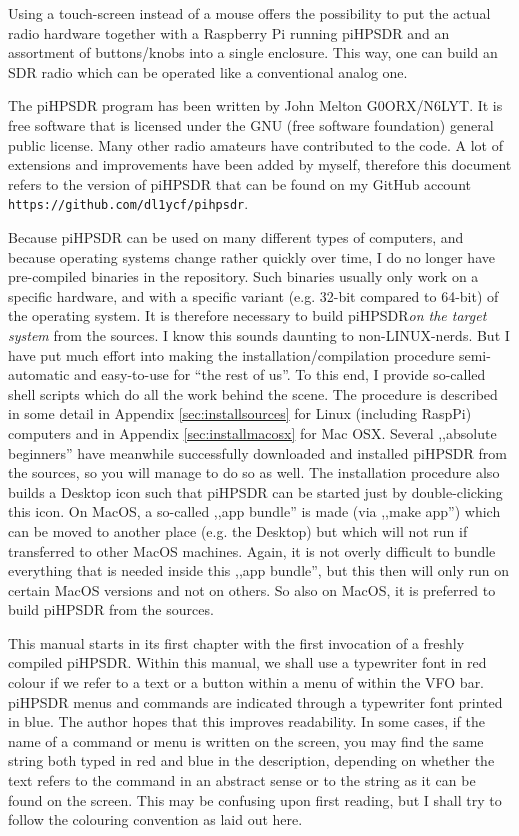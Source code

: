 \documentclass[12pt]{book}
\def\pH{pi\-HPSDR\xspace}
\begin{document}
Using a touch-screen instead of a mouse offers the possibility to put the actual radio hardware together
with a Raspberry Pi running \pH and an assortment of buttons/knobs into a single enclosure. This way,
one can build an SDR radio which can be operated like a conventional analog one.

The \pH program has been written by John Melton G0ORX/N6LYT. It is free software that is licensed under
the GNU (free software foundation) general public license. Many other radio amateurs have contributed to
the code. A lot of extensions and improvements have been added by myself, therefore this document refers
to the version of \pH that can be found on my GitHub account \texttt{https://github.com/dl1ycf/pihpsdr}.

Because \pH can be used on many different types of computers, and because operating systems change
rather quickly over time, I do no longer have pre-compiled binaries in the repository. Such binaries
usually only work on a specific hardware, and with a specific variant (e.g. 32-bit compared to 64-bit) of
the operating system. It is therefore necessary to build \pH \textit{on the target system}
from the sources. I know this sounds daunting to non-LINUX-nerds. But I have put much effort into making
the installation/compilation procedure semi-automatic and easy-to-use for ``the rest of us''.
To this end, I provide so-called shell scripts which do all the work behind the scene.
The procedure is described in some detail in Appendix \ref{sec:installsources} for Linux (including RaspPi)
computers and in Appendix \ref{sec:installmacosx} for Mac OSX. Several ,,absolute beginners'' have meanwhile
successfully downloaded and installed \pH from the sources, so you will manage to do so as well.
The installation procedure also builds a Desktop icon such that \pH can be started just by double-clicking
this icon.
On MacOS,
a so-called ,,app bundle'' is made (via ,,make app'') which can be moved to another place (e.g. the Desktop)
but which will not run if transferred to other MacOS machines. Again, it is not overly difficult
to bundle everything that is needed inside this ,,app bundle'', but this then will only run on certain
MacOS versions and not on others. So also on MacOS, it is preferred to build \pH from the sources.

This manual starts in its first chapter with the first invocation of a freshly compiled \pH.
Within this manual, we shall use a typewriter font in red colour if we refer to a text or a button within
a menu of within the VFO bar. \pH menus and commands are indicated through a typewriter font
printed in blue. The author hopes that this improves readability. In some cases, if the name of a command
or  menu is written on the screen, you may find the same string both typed in red and blue in the
description, depending on whether the text refers to the command in an abstract sense or to the string as it
can be found on the screen. This may be confusing upon first reading, but I shall try to follow the colouring
convention as laid out here.
\end{document}
